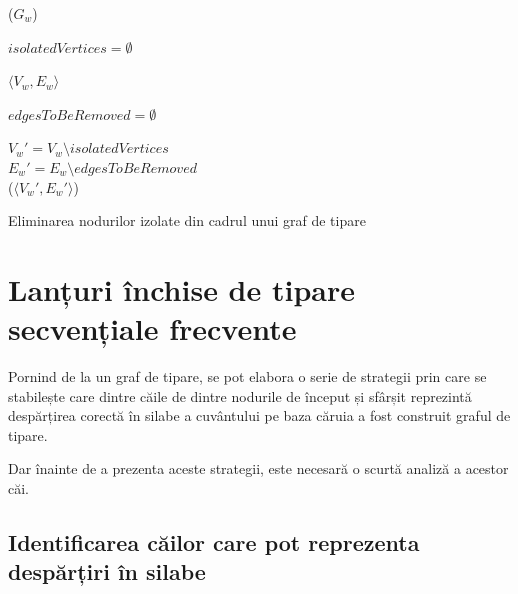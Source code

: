 \begin{algorithm}[h!]
\SetAlgoLined
{}

\ppg($G_{w}$) \\

$isolatedVertices = \emptyset$ \\

 {
	\KwRet $\langle V_w, E_w \rangle$
}


$edgesToBeRemoved = \emptyset$ \\

$V_w' = V_w \setminus isolatedVertices$\\
$E_w' = E_w \setminus edgesToBeRemoved$\\

\KwRet \ppg($\langle V_w', E_w'  \rangle$) \\
\vspace{.1cm}

\caption{Eliminarea nodurilor izolate din cadrul unui graf de tipare}
\label{algo:prunning}
\end{algorithm}

\section{Lanțuri închise de tipare secvențiale frecvente}

Pornind de la un graf de tipare, se pot elabora o serie de strategii prin care se stabilește care dintre căile de dintre nodurile de început și sfârșit reprezintă despărțirea corectă în silabe a cuvântului pe baza căruia a fost construit graful de tipare. 

Dar înainte de  a prezenta aceste strategii, este necesară o scurtă analiză a acestor căi.
\subsection{Identificarea căilor care pot reprezenta despărțiri în silabe}


